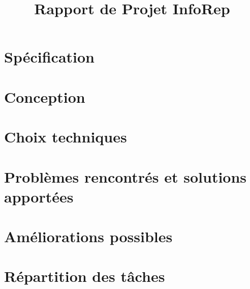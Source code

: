 \documentclass[13pt,titlepage,a4paper]{report}
\title{Rapport de Projet InfoRep}
\begin{document}
\tableofcontents



\paragraph{}\paragraph{}
\paragraph{}


\chapter{Spécification}

%
%
\chapter{Conception}

%
\chapter{Choix techniques}
%

%
\chapter{Problèmes rencontrés et solutions apportées}

%
%
%
\chapter{Améliorations possibles}
%
%
%
\chapter{Répartition des tâches}

%
%
%
% 
\end{document}

